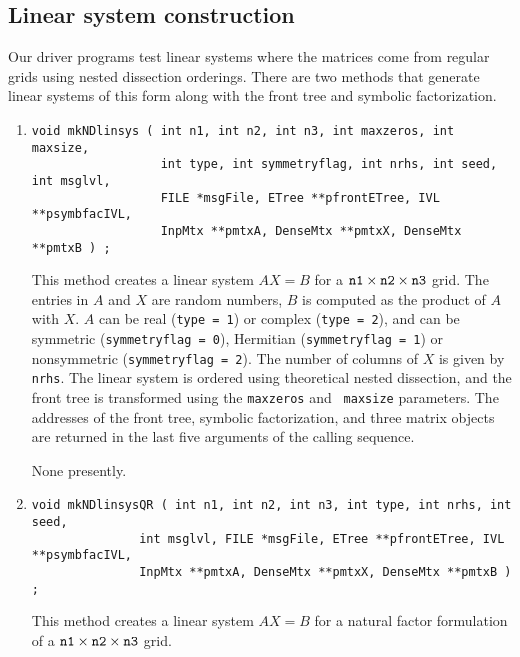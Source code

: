 \subsection{Linear system construction}
\par
Our driver programs test linear systems where the matrices come
from regular grids using nested dissection orderings.
There are two methods that generate linear systems of this form
along with the front tree and symbolic factorization.
\par
\begin{enumerate}
\item
\begin{verbatim}
void mkNDlinsys ( int n1, int n2, int n3, int maxzeros, int maxsize,
                  int type, int symmetryflag, int nrhs, int seed, int msglvl, 
                  FILE *msgFile, ETree **pfrontETree, IVL **psymbfacIVL, 
                  InpMtx **pmtxA, DenseMtx **pmtxX, DenseMtx **pmtxB ) ;
\end{verbatim}
This method creates a linear system $AX = B$ for a
${\tt n1} \times {\tt n2} \times {\tt n3}$ grid.
The entries in $A$ and $X$ are random numbers,
$B$ is computed as the product of $A$ with $X$.
$A$ can be real ({\tt type = 1}) or complex ({\tt type = 2}),
and can be symmetric ({\tt symmetryflag = 0}),
Hermitian ({\tt symmetryflag = 1}) or
nonsymmetric ({\tt symmetryflag = 2}).
The number of columns of $X$ is given by {\tt nrhs}.
The linear system is ordered using theoretical nested dissection,
and the front tree is transformed using the {\tt maxzeros} and {\tt
maxsize} parameters.
The addresses of the front tree, symbolic factorization, and three
matrix objects are returned in the last five arguments of the
calling sequence.
\par {}
None presently.
\item
\begin{verbatim}
void mkNDlinsysQR ( int n1, int n2, int n3, int type, int nrhs, int seed,
               int msglvl, FILE *msgFile, ETree **pfrontETree, IVL **psymbfacIVL, 
               InpMtx **pmtxA, DenseMtx **pmtxX, DenseMtx **pmtxB ) ;
\end{verbatim}
This method creates a linear system $AX = B$ for a
natural factor formulation of a
${\tt n1} \times {\tt n2} \times {\tt n3}$ grid.

\end{enumerate}
